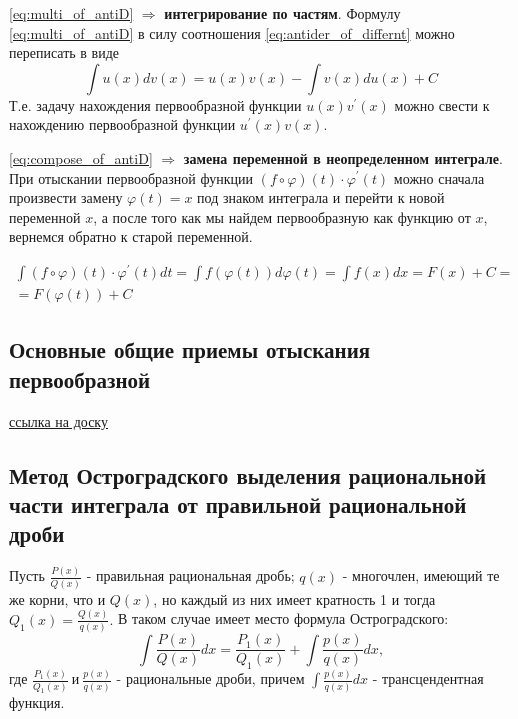 \documentclass[a4paper,14pt]{article} %
\begin{document}
    \noindent
    \eqref{eq:multi_of_antiD} \( \Rightarrow \) \textbf{интегрирование по частям}. Формулу \eqref{eq:multi_of_antiD} в силу соотношения \eqref{eq:antider_of_differnt} можно переписать в виде 
    \[
    \int{u(x)dv(x)} = u(x)v(x) - \int{v(x)du(x)} + C
    \]
    Т.е. задачу нахождения первообразной функции \( u(x)v^\prime{}(x) \) можно свести к нахождению первообразной функции \( u^\prime{}(x)v(x). \)
    
    \bigskip \noindent
    \eqref{eq:compose_of_antiD} \( \Rightarrow \) \textbf{замена переменной в неопределенном интеграле}. При отыскании первообразной функции \( (f\circ\varphi)(t)\cdot\varphi^\prime{}(t) \) можно сначала произвести замену \( \varphi(t) = x \) под знаком интеграла и перейти к новой переменной \( x \), а после того как мы найдем первообразную как функцию от \( x \), вернемся обратно к старой переменной.
    
    \begin{eqnarray}
    \int{(f\circ\varphi)(t)\cdot\varphi^\prime{}(t) dt} = \int{f(\varphi(t))d\varphi(t)} = \int{f(x)dx} = F(x) + C = \nonumber \\ =  F(\varphi(t)) + C \nonumber
    \end{eqnarray}
    
    
    
    \subsection{Основные общие приемы отыскания первообразной}
    
    \begin{center}
        \href{https://miro.com/app/board/uXjVOHbcyR4=/?invite_link_id=437398013079}{ссылка на доску}
    \end{center}
    
    \subsection[Метод Остроградского]{Метод Остроградского выделения рациональной части интеграла от правильной рациональной дроби}
    
    \noindent Пусть \( \frac{P(x)}{Q(x)}\) - правильная рациональная дробь; \( q(x) \) - многочлен, имеющий те же корни, что и \( Q(x) \), но каждый из них имеет кратность 1 и тогда \( Q_1(x) = \frac{Q(x)}{q(x)}. \) В таком случае имеет место формула Остроградского: 
    \[
    \int{\frac{P(x)}{Q(x)}dx} = \frac{P_1(x)}{Q_1(x)} + \int{\frac{p(x)}{q(x)}dx,}
    \]
    где \(\frac{P_1(x)}{Q_1(x)}\ \text{и}\ \frac{p(x)}{q(x)} \) - рациональные дроби, причем \( \int{\frac{p(x)}{q(x)}dx} \) - трансцендентная функция. 
    
\end{document}
